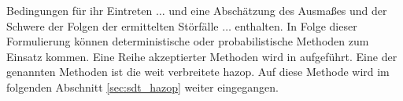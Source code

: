 Bedingungen für ihr Eintreten $\dots$ und eine \glqq Absch\"atzung des Ausma\ss{}es und der Schwere der Folgen der ermittelten St\"orf\"alle $\dots$ enthalten. In Folge dieser Formulierung k\"onnen deterministische oder probabilistische Methoden zum Einsatz kommen. Eine Reihe akzeptierter Methoden wird in  \cite[S. 20 f.]{2009_bimschv12Hilfe} aufgef\"uhrt. Eine der genannten Methoden ist die weit verbreitete \ac{hazop}. Auf diese Methode wird im folgenden Abschnitt \ref{sec:sdt_hazop} weiter eingegangen.
